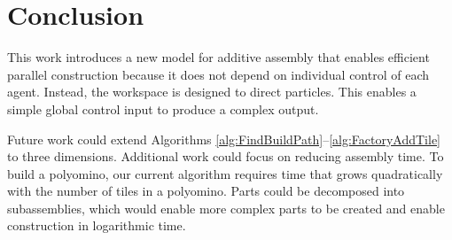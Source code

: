 
\section{Conclusion}\label{sec:Conclusion}

This work introduces a new model for additive assembly that enables efficient parallel construction because it does not depend on individual control of each agent.
Instead,   the workspace is designed  to direct particles. 
 This enables  a simple global control input to produce a complex output.

  
 
  

Future work could extend Algorithms \ref{alg:FindBuildPath}--\ref{alg:FactoryAddTile} to three dimensions. 
Additional work could focus on reducing assembly time. To build a polyomino, our current algorithm requires time that grows quadratically with the number of tiles in a polyomino.  
Parts could be decomposed into subassemblies, which would enable more complex parts to be created and enable construction in logarithmic time.

    